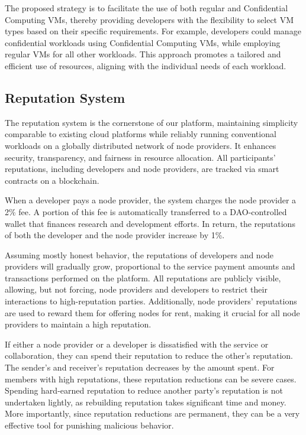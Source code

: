 The proposed strategy is to facilitate the use of both regular and Confidential Computing VMs, thereby providing developers with the flexibility to select VM types based on their specific requirements. For example, developers could manage confidential workloads using Confidential Computing VMs, while employing regular VMs for all other workloads. This approach promotes a tailored and efficient use of resources, aligning with the individual needs of each workload.

\subsection{Reputation System}
\label{sec:reputation_system}

The reputation system is the cornerstone of our platform, maintaining simplicity comparable to existing cloud platforms while reliably running conventional workloads on a globally distributed network of node providers. It enhances security, transparency, and fairness in resource allocation. All participants' reputations, including developers and node providers, are tracked via smart contracts on a blockchain.

When a developer pays a node provider, the system charges the node provider a 2\% fee. A portion of this fee is automatically transferred to a DAO-controlled wallet that finances research and development efforts. In return, the reputations of both the developer and the node provider increase by 1\%.

Assuming mostly honest behavior, the reputations of developers and node providers will gradually grow, proportional to the service payment amounts and transactions performed on the platform. All reputations are publicly visible, allowing, but not forcing, node providers and developers to restrict their interactions to high-reputation parties. Additionally, node providers' reputations are used to reward them for offering nodes for rent, making it crucial for all node providers to maintain a high reputation.

If either a node provider or a developer is dissatisfied with the service or collaboration, they can spend their reputation to reduce the other's reputation. The sender's and receiver's reputation decreases by the amount spent. For members with high reputations, these reputation reductions can be severe cases. Spending hard-earned reputation to reduce another party's reputation is not undertaken lightly, as rebuilding reputation takes significant time and money. More importantly, since reputation reductions are permanent, they can be a very effective tool for punishing malicious behavior.

